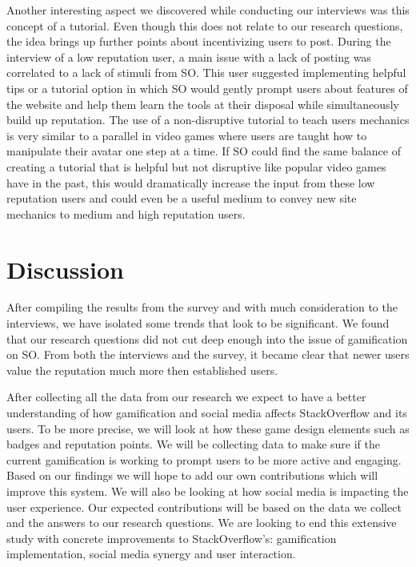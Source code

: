 \documentclass{sigchi}
\begin{document}
Another interesting aspect we discovered while conducting our interviews was this concept of a tutorial. Even though this does not relate to our research questions, the idea brings up further points about incentivizing users to post. During the interview of a low reputation user, a main issue with a lack of posting was correlated to a lack of stimuli from SO. This user suggested implementing helpful tips or a tutorial option in which SO would gently prompt users about features of the website and help them learn the tools at their disposal while simultaneously build up reputation. The use of a non-disruptive tutorial to teach users mechanics is very similar to a parallel in video games where users are taught how to manipulate their avatar one step at a time. If SO could find the same balance of creating a tutorial that is helpful but not disruptive like popular video games have in the past, this would dramatically increase the input from these low reputation users and could even be a useful medium to convey new site mechanics to medium and high reputation users.

\section{Discussion}

After compiling the results from the survey and with much consideration to the interviews, we have isolated some trends that look to be significant. We found that our research questions did not cut deep enough into the issue of gamification on SO. From both the interviews and the survey, it became clear that newer users value the reputation much more then established users.

After collecting all the data from our research we expect to have a better understanding of how gamification and social media affects StackOverflow and its users. To be more precise, we will look at how these game design elements such as badges and reputation points. We will be collecting data to make sure if the current gamification is working to prompt users to be more active and engaging. Based on our findings we will hope to add our own contributions which will improve this system. We will also be looking at how social media is impacting the user experience. Our expected contributions will be based on the data we collect and the answers to our research questions. We are looking to end this extensive study with concrete improvements to StackOverflow’s: gamification implementation, social media synergy and user interaction.
\end{document}
